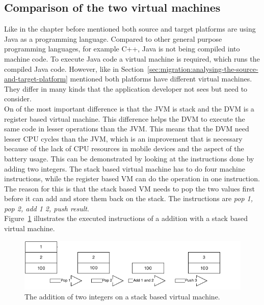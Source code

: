 \subsection{Comparison of the two virtual machines}
\label{sec:migration:comparison-of-the-two-virtual-machines}
Like in the chapter before mentioned both source and target platforms are using Java as a programming language.
Compared to other general purpose programming languages, for example C++, Java is not being compiled into machine code.
To execute Java code a virtual machine is required, which runs the compiled Java code.
However, like in Section~\ref{sec:migration:analysing-the-source-and-target-platform} mentioned both platforms have different virtual machines.
They differ in many kinds that the application developer not sees but need to consider.
\\
On of the most important difference is that the JVM is stack and the DVM is a register based virtual machine.
This difference helps the DVM to execute the same code in lesser operations than the JVM.
This means that the DVM need lesser CPU cycles than the JVM, which is an improvement that is necessary because of the lack of CPU resources in mobile devices and the aspect of the battery usage.
This can be demonstrated by looking at the instructions done by adding two integers.
The stack based virtual machine has to do four machine instructions, while the register based VM can do the operation in one instruction.
The reason for this is that the stack based VM needs to pop the two values first before it can add and store them back on the stack.
The instructions are \textit{pop 1, pop 2, add 1 2, push result}.\\
Figure~\ref{fig:stack-based-addition} illustrates the executed instructions of a addition with a stack based virtual machine.
\begin{figure}[h]
\begin{center}
\includegraphics[scale=0.65]{images/stack-based-addition.png} 
\caption{The addition of two integers on a stack based virtual machine.}
\label{fig:stack-based-addition}
\end{center}
\end{figure}

